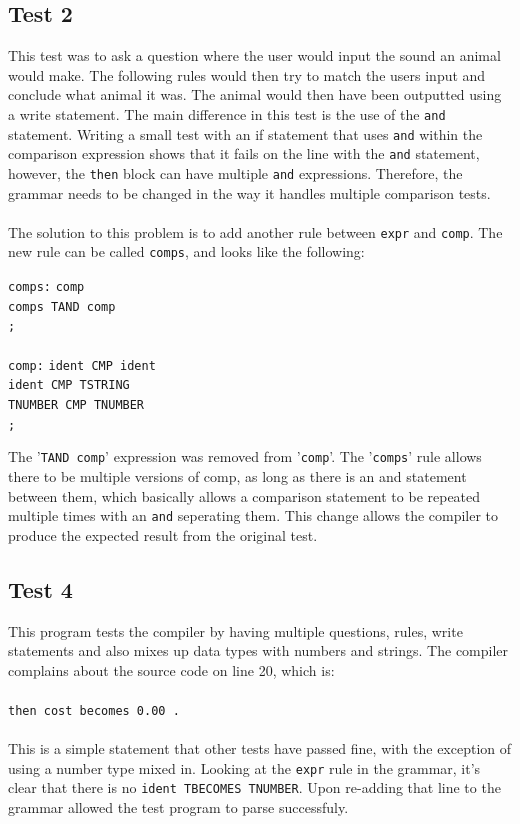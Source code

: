 \documentclass[12pt]{report}
\begin{document}
\subsection{Test 2}\label{sub:sec:test2}
This test was to ask a question where the user would input the sound an animal would make.  The following rules would then try to match the users input and conclude what animal it was.  The animal would then have been outputted using a write statement.  The main difference in this test is the use of the \texttt{and} statement.  Writing a small test with an if statement that uses \texttt{and} within the comparison expression shows that it fails on the line with the \texttt{and} statement, however, the \texttt{then} block can have multiple \texttt{and} expressions.  Therefore, the grammar needs to be changed in the way it handles multiple comparison tests.\\
\\
The solution to this problem is to add another rule between \texttt{expr} and \texttt{comp}.  The new rule can be called \texttt{comps}, and looks like the following:\\
\begin{tabbing}
	\texttt{comps:} \= \texttt{comp}\\
	\> \texttt{\textbar \space comps TAND comp}\\
	\> \texttt{;}\\
	\\
	\texttt{comp:} \= \texttt{ident CMP ident}\\
	\> \texttt{\textbar \space ident CMP TSTRING}\\
	\> \texttt{\textbar \space TNUMBER CMP TNUMBER}\\
	\> \texttt{;}\\
\end{tabbing}
The '\texttt{TAND comp}' expression was removed from '\texttt{comp}'.  The '\texttt{comps}' rule allows there to be multiple versions of comp, as long as there is an and statement between them, which basically allows a comparison statement to be repeated multiple times with an \texttt{and} seperating them.  This change allows the compiler to produce the expected result from the original test.
\subsection{Test 4}\label{sub:sec:test4}
This program tests the compiler by having multiple questions, rules, write statements and also mixes up data types with numbers and strings.  The compiler complains about the source code on line 20, which is:\\
\\
\texttt{then cost becomes 0.00 .}\\
\\
This is a simple statement that other tests have passed fine, with the exception of using a number type mixed in.  Looking at the \texttt{expr} rule in the grammar, it's clear that there is no \texttt{ident TBECOMES TNUMBER}.  Upon re-adding that line to the grammar allowed the test program to parse successfuly.
\end{document}
